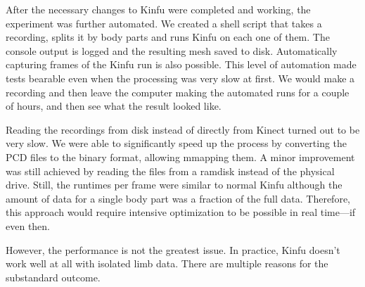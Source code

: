 After the necessary changes to Kinfu were completed and working, the experiment was further automated. We created a shell script that takes a recording, splits it by body parts and runs Kinfu on each one of them. The console output is logged and the resulting mesh saved to disk. Automatically capturing frames of the Kinfu run is also possible. This level of automation made tests bearable even when the processing was very slow at first. We would make a recording and then leave the computer making the automated runs for a couple of hours, and then see what the result looked like.

Reading the recordings from disk instead of directly from Kinect turned out to be very slow. We were able to significantly speed up the process by converting the PCD files to the binary format, allowing mmapping them. A minor improvement was still achieved by reading the files from a ramdisk instead of the physical drive. Still, the runtimes per frame were similar to normal Kinfu although the amount of data for a single body part was a fraction of the full data. Therefore, this approach would require intensive optimization to be possible in real time---if even then.

However, the performance is not the greatest issue. In practice, Kinfu doesn't work well at all with isolated limb data. There are multiple reasons for the substandard outcome.

